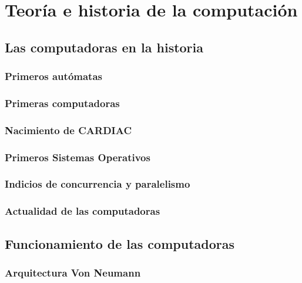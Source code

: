 \documentclass[letterpaper,12pt,oneside]{book}
\begin{document}



\tableofcontents
\listoffigures

\mainmatter

\chapter{Teoría e historia de la computación} %


\section{Las computadoras en la historia}
	\subsection{Primeros autómatas}
	\subsection{Primeras computadoras}
	\subsection{Nacimiento de CARDIAC}
	\subsection{Primeros Sistemas Operativos}
	
	\subsection{Indicios de concurrencia y paralelismo}
	
	\subsection{Actualidad de las computadoras}
   
\section{Funcionamiento de las computadoras}   
	\subsection{Arquitectura Von Neumann}   
\end{document}
